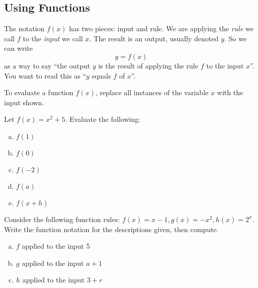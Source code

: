 \documentclass[notes]{subfiles}
\begin{document}
	\subsection*{Using Functions}
		\begin{rmk}
			The notation \(f(x)\) has two pieces: input and rule. We are applying the \emph{rule} we call \(f\) to the \emph{input} we call \(x\). The result is an output, usually denoted \(y\). So we can write
			\[y = f(x)\]
			as a way to say ``the output \(y\) is the result of applying the rule \(f\) to the input \(x\)''. You want to read this as ``\(y\) equals \(f\) of \(x\)''.
		\end{rmk}

		\begin{rmk}
			To evaluate a function \(f(x)\), replace all instances of the variable \(x\) with the input shown.
		\end{rmk}

		\begin{ex}
			Let \(f(x) = x^2 + 5\). Evaluate the following:
			\begin{multicols}{2}
				\begin{enumerate}[(a)]
					\item \(f(1)\)
						\vspace*{35pt}

					\item \(f(0)\)
						\vspace*{35pt}

					\item \(f(-2)\)
						\vspace*{35pt}

					\item \(f(a)\)
						\vspace*{35pt}

					\item \(f(x + h)\)
						\vspace*{35pt}
				\end{enumerate}
			\end{multicols}
		\end{ex}

		\begin{ex}
			Consider the following function rules: \(f(x) = x-1, g(x) = -x^2, h(x) = 2^x\). Write the function notation for the descriptions given, then compute.
			\begin{enumerate}[(a)]
				\item \(f\) applied to the input 5
					\vs{1}
					\newpage

				\item \(g\) applied to the input \(a + 1\)
					\vs{1}

				\item \(h\) applied to the input \(3 + r\)
					\vs{1}
			\end{enumerate}
		\end{ex}	
		
\end{document}
